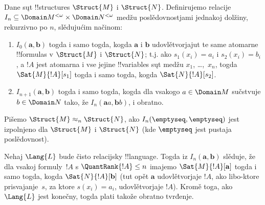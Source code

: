 \documentclass[../../../include/open-logic-section]{subfiles}
\begin{document}
\begin{defn}
  Dane sųt !!{structure}s $\Struct{M}$ i $\Struct{N}$. Definirujemo
  relacije $I_n \subseteq \Domain M^{<\omega} \times \Domain N^{<\omega}$ medžu
  poslědovnostjami jednakoj dolžiny, rekurzivno po $n$, slědujućim
  načinom:
   \begin{enumerate}
   \item $I_0(\mathbf{a},\mathbf{b})$ togda i samo togda, kogda
     $\mathbf{a}$ i $\mathbf{b}$ udovlětvorjajut te same atomarne
     !!{formula}s v $\Struct{M}$ i $\Struct{N}$; t.j. ako
     $s_1(x_i) = a_i$ i $s_2(x_i) =
     b_i$, a $!A$ jest atomarna i vse
     jejine !!{variable}s sųt medžu $x_1$, \dots,~$x_n$, togda
     $\Sat{M}{!A}[s_1]$ togda i samo togda, kogda
     $\Sat{N}{!A}[s_2]$.
   \item $I_{n+1} (\mathbf{a},\mathbf{b})$ togda i samo togda, kogda
     dla vsakogo $a\in \Domain M$ sučstvuje $b\in \Domain N$ tako, že
     $I_n
     (\mathbf{a}a,\mathbf{b}b)$, i obratno.
   \end{enumerate}
\end{defn}


\begin{defn}
  Pišemo $\Struct{M} \approx_n \Struct{N}$, ako
  $I_n(\emptyseq,\emptyseq)$ jest izpolnjeno dla $\Struct{M}$ i
  $\Struct{N}$ (kde $\emptyseq$ jest pustaja poslědovnost).
\end{defn}

\begin{thm}
  Nehaj $\Lang{L}$ bude čisto relacijsky !!{language}. Togda iz $I_n
  (\mathbf{a},\mathbf{b})$ slěduje, že dla vsakoj formuly~$!A$ s
  $\QuantRank{!A} \le n$ imajemo $\Sat{M}{!A}[\mathbf{a}]$ togda i
  samo togda, kogda $\Sat{N}{!A}[\mathbf{b}]$ (tut opět $\mathbf{a}$
  udovlětvorjaje $!A$, ako libo-ktore prisvajanje~$s$, za ktore
  $s(x_i) = a_i$, udovlětvorjaje $!A$). Kromě toga,
  ako $\Lang{L}$ jest konečny, togda plati takože obratno tvrđenje.
\end{thm}
\end{document}
